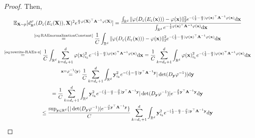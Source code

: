 \begin{proof}
    Then, 
    \begin{multline}
        \mathbb{E}_{\stoVector \sim p}[\distance_{\Real^{\dimInd}}^\diffeo (D_\RAErelerror(E_\RAErelerror(\stoVector)), \stoVector)^2 e^{\frac{\RAEboundParamB}{2} \diffeo(\stoVector)^\top \spdMatrix^{-1} \diffeo(\stoVector)}] = \frac{\int_{\Real^\dimInd}  \| \diffeo(D_\RAErelerror(E_\RAErelerror(\Vector))) - \diffeo(\Vector) \|_2^2 e^{-(\frac{1}{2} - \frac{\RAEboundParamB}{2}) \diffeo(\Vector)^\top \spdMatrix^{-1} \diffeo(\Vector)} \mathrm{d} \Vector}{\int_{\Real^{\dimInd}} e^{-\frac{1}{2} \diffeo(\Vector)^\top \spdMatrix^{-1} \diffeo(\Vector)} \mathrm{d} \Vector}  \\
        \overset{\text{\ref{eq:RAEnormalizationConstant}}}{=} \frac{1}{\RAEnormalizationConstant} \int_{\Real^\dimInd}  \| \diffeo(D_\RAErelerror(E_\RAErelerror(\Vector))) - \diffeo(\Vector) \|_2^2 e^{-(\frac{1}{2} - \frac{\RAEboundParamB}{2}) \diffeo(\Vector)^\top \spdMatrix^{-1} \diffeo(\Vector)} \mathrm{d} \Vector \\
        \overset{\text{\ref{eq:rewrite-RAEx-x}}}{=} \frac{1}{\RAEnormalizationConstant} \int_{\Real^\dimInd}  \sum_{\sumIndC=\dimInd_\RAErelerror+1}^{\dimInd}\diffeo(\Vector)_{\sumIndA_\sumIndC}^2 e^{-(\frac{1}{2} - \frac{\RAEboundParamB}{2}) \diffeo(\Vector)^\top \spdMatrix^{-1} \diffeo(\Vector)} \mathrm{d} \Vector = \frac{1}{\RAEnormalizationConstant} \sum_{\sumIndC=\dimInd_\RAErelerror+1}^{\dimInd} \int_{\Real^\dimInd}  \diffeo(\Vector)_{\sumIndA_\sumIndC}^2 e^{-(\frac{1}{2} - \frac{\RAEboundParamB}{2}) \diffeo(\Vector)^\top \spdMatrix^{-1} \diffeo(\Vector)} \mathrm{d} \Vector\\
        \overset{\Vector =\diffeo^{-1}(\VectorB) }{=} \frac{1}{\RAEnormalizationConstant} \sum_{\sumIndC=\dimInd_\RAErelerror+1}^{\dimInd} \int_{\Real^\dimInd} \VectorB_{\sumIndA_\sumIndC}^2 e^{-(\frac{1}{2} - \frac{\RAEboundParamB}{2}) \VectorB^\top \spdMatrix^{-1} \VectorB} |\det(D_{\VectorB}\diffeo^{-1})|\mathrm{d} \VectorB \\
        = \frac{1}{\RAEnormalizationConstant} \sum_{\sumIndC=\dimInd_\RAErelerror+1}^{\dimInd} \int_{\Real^\dimInd} \VectorB_{\sumIndA_\sumIndC}^2 e^{-(\frac{1}{2} - \frac{\RAEboundParamB}{2} - \frac{\RAEboundParam}{2}) \VectorB^\top \spdMatrix^{-1} \VectorB} |\det(D_{\VectorB}\diffeo^{-1})|  e^{-\frac{\RAEboundParam}{2} \VectorB^\top \spdMatrix^{-1} \VectorB}\mathrm{d} \VectorB\\
        \leq \frac{\sup_{\VectorB\in \Real^\dimInd} \{|\det(D_{\VectorB}\diffeo^{-1})|  e^{-\frac{\RAEboundParam}{2} \VectorB^\top \spdMatrix^{-1} \VectorB}\}}{\RAEnormalizationConstant} \sum_{\sumIndC=\dimInd_\RAErelerror+1}^{\dimInd} \int_{\Real^\dimInd} \VectorB_{\sumIndA_\sumIndC}^2 e^{-(\frac{1}{2} - \frac{\RAEboundParamB}{2} - \frac{\RAEboundParam}{2}) \VectorB^\top \spdMatrix^{-1} \VectorB} \mathrm{d} \VectorB \\

\end{multline}
\end{proof}
